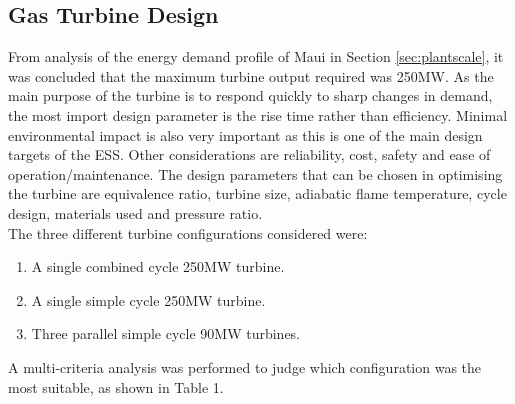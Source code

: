 \subsection{Gas Turbine Design} \label{sec:turbinetargets}
From analysis of the energy demand profile of Maui in Section \ref{sec:plantscale}, it was concluded that the maximum turbine output required was 250MW. As the main purpose of the turbine is to respond quickly to sharp changes in demand, the most import design parameter is the rise time rather than efficiency. Minimal environmental impact is also very important as this is one of the main design targets of the ESS. Other considerations are reliability, cost, safety and ease of operation/maintenance. The design parameters that can be chosen in optimising the turbine are equivalence ratio, turbine size, adiabatic flame temperature, cycle design, materials used and pressure ratio.\\The three different turbine configurations considered were:
\begin {enumerate}
\item A single combined cycle 250MW turbine.
\item A single simple cycle 250MW turbine. 
\item Three parallel simple cycle 90MW turbines. 
\end {enumerate}
A multi-criteria analysis was performed to judge which configuration was the most suitable, as shown in Table 1.

